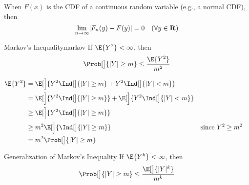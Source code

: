 \begin{Remark}{}{}
    When $ F(x) $ is the CDF of a continuous random variable
    (e.g., a normal CDF), then
    \[ \lim\limits_{{n} \to {\infty}} \lvert F_n(y)-F(y)\rvert=0\quad(\forall y\in\mathbf{R}) \]
\end{Remark}
\begin{Theorem}{Markov's Inequality}{markov}
    If $ \E{Y^2}<\infty $, then
    \[ \Prob[\big]{\abs{Y}\ge m}\le \frac{\E{Y^2}}{m^2}  \]
\end{Theorem}
\begin{Proof}{}{}
    \begin{align*}
        \E{Y^2}
         & =\E[\Big]{Y^2 \Ind[\big]{\abs{Y}\ge m}+Y^2 \Ind[\big]{\abs{Y}<m}}                                          \\
         & =\E[\Big]{Y^2 \Ind[\big]{\abs{Y}\ge m}} + \E[\Big]{Y^2 \Ind[\big]{\abs{Y}<m}}                              \\
         & \ge \E[\Big]{Y^2 \Ind[\big]{\abs{Y}\ge m}}                                                                 \\
         & \ge m^2\E[\Big]{\Ind[\big]{\abs{Y}\ge m}}                                     &  & \text{since }Y^2\ge m^2 \\
         & =m^2\Prob[\big]{\abs{Y}\ge m}
    \end{align*}
\end{Proof}
\begin{Remark}{Generalization of Markov's Inequality}{}
    If $ \E{Y^k}<\infty $, then
    \[ \Prob[\big]{\abs{Y}\ge m}\le  \frac{\E[\big]{\abs{Y}^k}}{m^k}  \]
\end{Remark}
